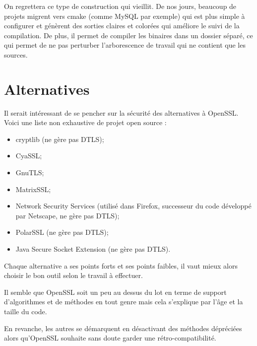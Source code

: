 On regrettera ce type de construction qui vieillit. De nos jours, beaucoup de projets migrent vers cmake (comme MySQL par exemple) qui est plus simple à configurer et génèrent des sorties claires et colorées qui améliore le suivi de la compilation. De plus, il permet de compiler les binaires dans un dossier séparé, ce qui permet de ne pas perturber l'arborescence de travail qui ne contient que les sources.


\section{Alternatives}
Il serait intéressant de se pencher sur la sécurité des alternatives à OpenSSL. Voici une liste non exhaustive de projet open source :
\begin{itemize}
\item cryptlib (ne gère pas DTLS);
\item CyaSSL;
\item GnuTLS;
\item MatrixSSL;
\item Network Security Services	(utilisé dans Firefox, successeur du code développé par Netscape, ne gère pas DTLS);
\item PolarSSL (ne gère pas DTLS);
\item Java Secure Socket Extension (ne gère pas DTLS).
\end{itemize}

Chaque alternative a ses points forts et ses points faibles, il vaut mieux alors choisir le bon outil selon le travail à effectuer.

Il semble que OpenSSL soit un peu au dessus du lot en terme de support d'algorithmes et de méthodes en tout genre mais cela s'explique par l'âge et la taille du code. 

En revanche, les autres se démarquent en désactivant des méthodes dépréciées alors qu'OpenSSL souhaite sans doute garder une rétro-compatibilité.
